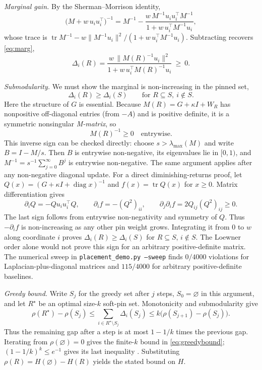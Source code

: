 \documentclass[11pt]{article}
\theoremstyle{definition}
\DeclareMathOperator{\diag}{diag}
\DeclareMathOperator{\tr}{tr}
\begin{document}
\emph{Marginal gain.} By the Sherman--Morrison identity,
\[
  \bigl(M+w\,u_iu_i^\top\bigr)^{-1}=M^{-1}-\frac{w\,M^{-1}u_iu_i^\top M^{-1}}{1+w\,u_i^\top M^{-1}u_i},
\]
whose trace is $\tr M^{-1}-w\|M^{-1}u_i\|^2/(1+w\,u_i^\top M^{-1}u_i)$. Subtracting recovers
\eqref{eq:marg},
\[
  \Delta_i(R)=\frac{w\,\|M(R)^{-1}u_i\|^2}{1+w\,u_i^\top M(R)^{-1}u_i}\ \ge\ 0 .
\]

\emph{Submodularity.} We must show the marginal is non-increasing in the pinned set,
\[
  \Delta_i(R)\ge\Delta_i(S)\qquad\text{for } R\subseteq S,\ i\notin S .
\]
Here the structure of $G$ is essential. Because $M(R)=G+\kappa I+W_R$ has nonpositive off-diagonal
entries (from $-A$) and is positive definite, it is a symmetric nonsingular \emph{M-matrix}, so
\[
  M(R)^{-1}\ge0\quad\text{entrywise}.
\]
This inverse sign can be checked directly: choose $s>\lambda_{\max}(M)$ and write
$B=I-M/s$. Then $B$ is entrywise non-negative, its eigenvalues lie in $[0,1)$, and
$M^{-1}=s^{-1}\sum_{j=0}^{\infty}B^j$ is entrywise non-negative. The same argument applies
after any non-negative diagonal update.
For a direct diminishing-returns proof, let $Q(x)=(G+\kappa I+\diag x)^{-1}$ and
$f(x)=\tr Q(x)$ for $x\ge0$. Matrix differentiation gives
\[
 \partial_i Q=-Qu_iu_i^\top Q,\qquad
 \partial_i f=-(Q^2)_{ii},\qquad
 \partial_j\partial_i f=2Q_{ij}(Q^2)_{ij}\ge0.
\]
The last sign follows from entrywise non-negativity and symmetry of $Q$.
Thus $-\partial_i f$ is non-increasing as any other pin weight grows. Integrating it from $0$ to
$w$ along coordinate $i$ proves $\Delta_i(R)\ge\Delta_i(S)$ for $R\subseteq S$, $i\notin S$.
The Loewner order alone would not prove this sign for an arbitrary positive-definite matrix.
The numerical sweep in \texttt{placement\_demo.py --sweep} finds $0/4000$ violations for
Laplacian-plus-diagonal matrices and $115/4000$ for arbitrary positive-definite baselines.

\emph{Greedy bound.} Write $S_j$ for the greedy set after $j$ steps, $S_0=\varnothing$ in this
argument, and let $R^\star$ be an optimal size-$k$ soft-pin set. Monotonicity and submodularity give
\[
 \rho(R^\star)-\rho(S_j)
 \le\sum_{i\in R^\star\setminus S_j}\Delta_i(S_j)
 \le k\bigl(\rho(S_{j+1})-\rho(S_j)\bigr).
\]
Thus the remaining gap after a step is at most $1-1/k$ times the previous gap. Iterating from
$\rho(\varnothing)=0$ gives the finite-$k$ bound in \eqref{eq:greedybound};
$(1-1/k)^k\le e^{-1}$ gives its last inequality \cite{Nemhauser}. Substituting
$\rho(R)=H(\varnothing)-H(R)$ yields the stated bound on $H$.
\end{document}
